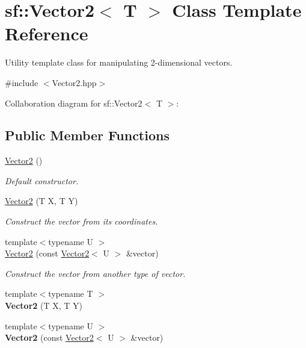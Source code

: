 \hypertarget{classsf_1_1_vector2}{}\section{sf\+:\+:Vector2$<$ T $>$ Class Template Reference}
\label{classsf_1_1_vector2}


Utility template class for manipulating 2-\/dimensional vectors.  




{\ttfamily \#include $<$Vector2.\+hpp$>$}



Collaboration diagram for sf\+:\+:Vector2$<$ T $>$\+:
\subsection*{Public Member Functions}
\begin{DoxyCompactItemize}
\item 
\hyperlink{classsf_1_1_vector2_a58c32383b5291380db4b43a289f75988}{Vector2} ()
\begin{DoxyCompactList}\small\item\em Default constructor. \end{DoxyCompactList}\item 
\hyperlink{classsf_1_1_vector2_aed26a72164e59e8a4a0aeee2049568f1}{Vector2} (T X, T Y)
\begin{DoxyCompactList}\small\item\em Construct the vector from its coordinates. \end{DoxyCompactList}\item 
{\footnotesize template$<$typename U $>$ }\\\hyperlink{classsf_1_1_vector2_a3da455e0ae3f8ff6d2fe36d10b332d10}{Vector2} (const \hyperlink{classsf_1_1_vector2}{Vector2}$<$ U $>$ \&vector)
\begin{DoxyCompactList}\small\item\em Construct the vector from another type of vector. \end{DoxyCompactList}\item 
\mbox{\label{classsf_1_1_vector2_a18a61144d6839c5658b62ebb49c9eb68}} 
{\footnotesize template$<$typename T $>$ }\\{\bfseries Vector2} (T X, T Y)
\item 
\mbox{\label{classsf_1_1_vector2_a3da455e0ae3f8ff6d2fe36d10b332d10}} 
{\footnotesize template$<$typename U $>$ }\\{\bfseries Vector2} (const \hyperlink{classsf_1_1_vector2}{Vector2}$<$ U $>$ \&vector)
\end{DoxyCompactItemize}

